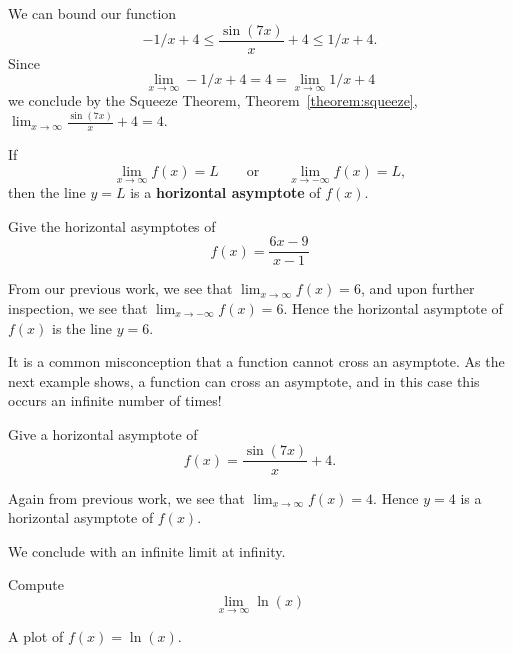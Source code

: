 \begin{solution}
We can bound our function
\[
-1/x + 4 \le \frac{\sin(7x)}{x}+4 \le 1/x + 4.
\]
Since 
\[
\lim_{x\to \infty} -1/x + 4 = 4 = \lim_{x\to \infty}1/x + 4
\] 
we conclude by the Squeeze Theorem, Theorem~\ref{theorem:squeeze},
$\lim_{x\to\infty}\frac{\sin(7x)}{x}+4 = 4$.
\end{solution}






\begin{definition}\label{def:horiz asymptote}
If  
\[
\lim_{x\to \infty} f(x) = L \qquad\text{or}\qquad \lim_{x\to -\infty} f(x) = L,
\]
then the line $y=L$ is a \textbf{horizontal asymptote} of $f(x)$.
\end{definition}

\begin{example} 
Give the horizontal asymptotes of
\[
f(x) = \frac{6x-9}{x-1}
\]
\end{example}

\begin{solution}
From our previous work, we see that $\lim_{x\to \infty} f(x) = 6$, and
upon further inspection, we see that $\lim_{x\to -\infty} f(x) =
6$. Hence the horizontal asymptote of $f(x)$ is the line $y=6$.
\end{solution}


It is a common misconception that a function cannot cross an
asymptote. As the next example shows, a function can cross an
asymptote, and in this case this occurs an infinite number of times!

\begin{example}
Give a horizontal asymptote of
\[
f(x) = \frac{\sin(7x)}{x}+4.
\]
\end{example}

\begin{solution}
Again from previous work, we see that $\lim_{x\to \infty} f(x) =
4$. Hence $y=4$ is a horizontal asymptote of $f(x)$.
\end{solution}


We conclude with an infinite limit at infinity.

\begin{example}
Compute
\[
\lim_{x\to \infty} \ln(x)
\]
\end{example}
\begin{marginfigure}[0in]
\caption{A plot of $f(x)=\ln(x)$.}
\label{plot:lnx}
\end{marginfigure}

